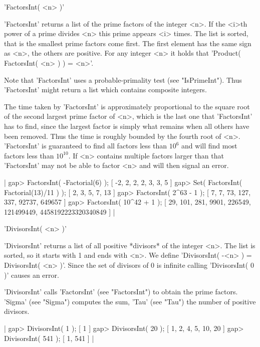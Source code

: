 'FactorsInt( <n> )'

'FactorsInt' returns a list of the prime factors of the  integer <n>.  If
the <i>th power of a prime divides <n> this prime appears <i> times.  The
list is sorted, that is the smallest prime factors come first.  The first
element has  the same  sign  as  <n>, the others   are positive.  For any
integer <n> it holds that 'Product( FactorsInt( <n> ) ) = <n>'.

Note that 'FactorsInt' uses a probable-primality test (see "IsPrimeInt").
Thus 'FactorsInt' might return a list which contains composite integers.

The time taken by   'FactorsInt'  is approximately  proportional to   the
square root of the second largest prime factor  of <n>, which is the last
one that 'FactorsInt'  has to find,   since the largest  factor is simply
what remains when all others have been removed.  Thus the time is roughly
bounded by  the fourth  root of <n>.   'FactorsInt' is guaranteed to find
all factors   less than  $10^6$  and will find  most    factors less than
$10^{10}$.    If <n>    contains   multiple  factors   larger  than  that
'FactorsInt' may not be able to factor <n> and will then signal an error.

|    gap> FactorsInt( -Factorial(6) );
    [ -2, 2, 2, 2, 3, 3, 5 ]
    gap> Set( FactorsInt( Factorial(13)/11 ) );
    [ 2, 3, 5, 7, 13 ]
    gap> FactorsInt( 2^63 - 1 );
    [ 7, 7, 73, 127, 337, 92737, 649657 ]
    gap> FactorsInt( 10^42 + 1 );
    [ 29, 101, 281, 9901, 226549, 121499449, 4458192223320340849 ] |

%

'DivisorsInt( <n> )'

'DivisorsInt'  returns a list of all  positive  *divisors* of the integer
<n>.  The list  is sorted, so  it starts with 1 and  ends with <n>.    We
define 'DivisorsInt(  -<n> ) =  DivisorsInt(  <n> )'.   Since the  set of
divisors of 0 is infinite calling 'DivisorsInt( 0 )' causes an error.

'DivisorsInt' calls 'FactorsInt' (see  "FactorsInt")  to obtain the prime
factors.  'Sigma' (see  "Sigma") computes the sum,  'Tau' (see "Tau") the
number of positive divisors.

|    gap> DivisorsInt( 1 );
    [ 1 ]
    gap> DivisorsInt( 20 );
    [ 1, 2, 4, 5, 10, 20 ]
    gap> DivisorsInt( 541 );
    [ 1, 541 ] |

